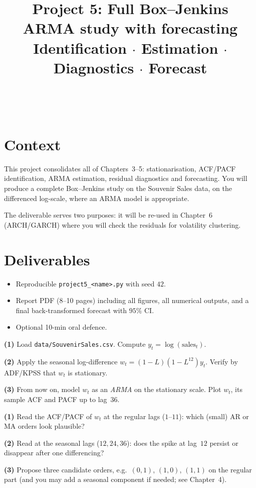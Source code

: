 \documentclass[a4paper,11pt]{article}
\title{Project 5: Full Box--Jenkins ARMA study with forecasting\\
\large Identification $\cdot$ Estimation $\cdot$ Diagnostics $\cdot$ Forecast}
\author{\auteurNom\\\auteurEmail\\\auteurInstitution}
\date{\anneeUniversitaire}
\begin{document}
\maketitle

\section*{Context}

This project consolidates all of Chapters~3--5: stationarisation,
ACF/PACF identification, ARMA estimation, residual diagnostics and
forecasting. You will produce a complete Box--Jenkins study on the
Souvenir Sales data, on the differenced log-scale, where an
ARMA model is appropriate.

The deliverable serves two purposes: it will be re-used in
Chapter~6 (ARCH/GARCH) where you will check the residuals for
volatility clustering.

\section*{Deliverables}
\begin{itemize}
  \item Reproducible \texttt{project5\_<name>.py} with seed $42$.
  \item Report PDF (8--10 pages) including all figures, all
        numerical outputs, and a final back-transformed forecast
        with $95\%$ CI.
  \item Optional 10-min oral defence.
\end{itemize}

\begin{exercise}[Stationarisation]
\textbf{(1)} Load \texttt{data/SouvenirSales.csv}. Compute
$y_t = \log(\text{sales}_t)$.

\textbf{(2)} Apply the seasonal log-difference
$w_t = (1 - L)(1 - L^{12}) y_t$. Verify by ADF/KPSS that $w_t$ is
stationary.

\textbf{(3)} From now on, model $w_t$ as an \emph{ARMA} on the
stationary scale. Plot $w_t$, its sample ACF and PACF up to
lag~$36$.
\end{exercise}

\begin{exercise}[Identification]
\textbf{(1)} Read the ACF/PACF of $w_t$ at the regular lags
($1$--$11$): which (small) AR or MA orders look plausible?

\textbf{(2)} Read at the seasonal lags ($12, 24, 36$): does the
spike at lag~$12$ persist or disappear after one differencing?

\textbf{(3)} Propose three candidate orders, e.g.\
$(0, 1)$, $(1, 0)$, $(1, 1)$ on the regular part (and you may add a
seasonal component if needed; see Chapter~4).
\end{exercise}
\end{document}

